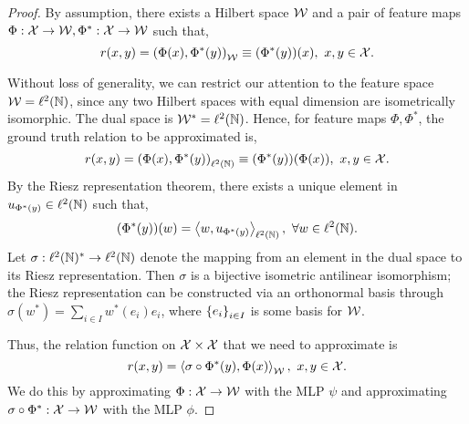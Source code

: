 \begin{proof}
    By assumption, there exists a Hilbert space ${\mathcal{W}}$ and a pair of feature maps $\Phi: {\mathcal{X}} \to {\mathcal{W}}, \Phi^*: {\mathcal{X}} \to {\mathcal{W}}$ such that,
    \begin{equation*}
        r(x, y) = \paren{\Phi(x), \Phi^*(y)}_{\calW} \equiv (\Phi^*(y))(x), \ x, y \in \calX.
    \end{equation*}

    Without loss of generality, we can restrict our attention to the feature space ${\mathcal{W}} = \ell^2({\mathbb{N}})$, since any two Hilbert spaces with equal dimension are isometrically isomorphic. The dual space is ${\mathcal{W}}^* = \ell^2({\mathbb{N}})$. Hence, for feature maps $\Phi, \Phi^*$, the ground truth relation to be approximated is,
    \begin{equation*}
        r(x, y) = \paren{\Phi(x), \Phi^*(y)}_{\ell^2(\bbN)} \equiv (\Phi^*(y))(\Phi(x)), \ x, y \in \calX.
    \end{equation*}
    By the Riesz representation theorem, there exists a unique element in $u_{\Phi^*(y)} \in \ell^2({\mathbb{N}})$ such that,
    \begin{equation*}
        (\Phi^*(y))(w) = \iprod{w}{u_{\Phi^*(y)}}_{\ell^2(\bbN)}, \ \forall w \in \ell^2(\bbN).
    \end{equation*}
    Let $\sigma: \ell^2({\mathbb{N}})^* \to \ell^2({\mathbb{N}})$ denote the mapping from an element in the dual space to its Riesz representation. Then $\sigma$ is a bijective isometric antilinear isomorphism; the Riesz representation can be constructed via an orthonormal basis through $\sigma(w^*) = \sum_{i \in I} w^{*}(e_i) e_i$, where $\left\{e_i\right\}_{i \in I}$ is some basis for ${\mathcal{W}}$.

    Thus, the relation function on ${\mathcal{X}} \times {\mathcal{X}}$ that we need to approximate is
    \begin{equation*}
        r(x, y) = \iprod{\sigma \circ \Phi^* (y)}{\Phi(x)}_{\calW}, \ x, y \in \calX.
    \end{equation*}
    We do this by approximating $\Phi: {\mathcal{X}} \to {\mathcal{W}}$ with the MLP $\psi$ and approximating $\sigma \circ \Phi^*: {\mathcal{X}} \to {\mathcal{W}}$ with the MLP $\phi$.


\end{proof}

